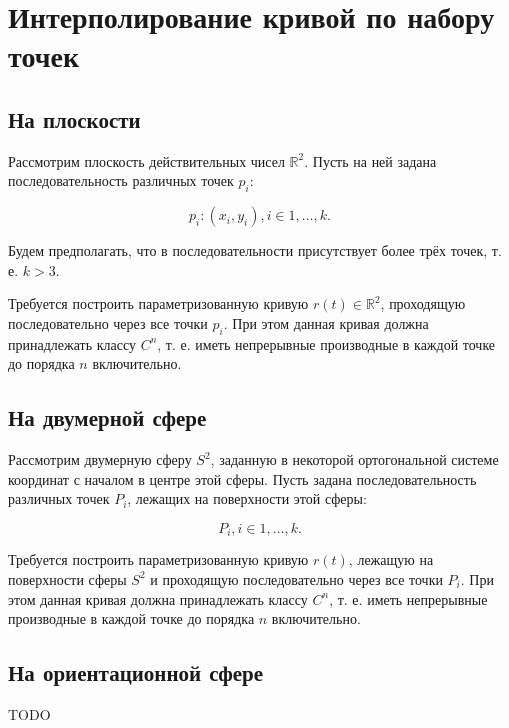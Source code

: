 \section{Интерполирование кривой по набору точек}

\subsection*{На плоскости}

Рассмотрим плоскость действительных чисел $\mathbb{R}^2$. Пусть на ней задана последовательность различных точек $p_i$:

$${p_i: (x_i, y_i)}, i \in {1, \dots, k}.$$

Будем предполагать, что в последовательности присутствует более трёх точек, т. е. $k > 3$.

Требуется построить параметризованную кривую $r(t) \in \mathbb{R}^2$, проходящую последовательно через все точки
$p_i$. При этом данная кривая должна принадлежать классу $C^n$, т. е. иметь непрерывные производные в каждой точке до
порядка $n$ включительно.

\subsection*{На двумерной сфере}

Рассмотрим двумерную сферу $S^2$, заданную в некоторой ортогональной системе координат с началом в центре этой сферы.
Пусть задана последовательность различных точек $P_i$, лежащих на поверхности этой сферы:

$${P_i}, i \in {1, \dots, k}.$$

Требуется построить параметризованную кривую $r(t)$, лежащую на поверхности сферы $S^2$ и проходящую последовательно
через все точки $P_i$. При этом данная кривая должна принадлежать классу $C^n$, т. е. иметь непрерывные производные в
каждой точке до порядка $n$ включительно.

\subsection*{На ориентационной сфере}

TODO
